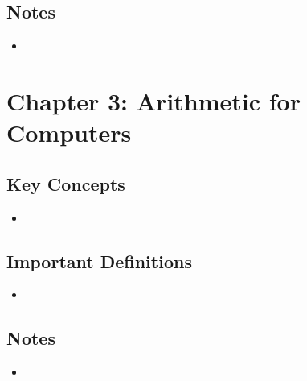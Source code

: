 \documentclass[12pt]{article}
\begin{document}
\subsection*{Notes}
\begin{itemize}
    \item 
\end{itemize}

\newpage

\section*{Chapter 3: Arithmetic for Computers}
\subsection*{Key Concepts}
\begin{itemize}
    \item 
\end{itemize}

\subsection*{Important Definitions}
\begin{itemize}
    \item 
\end{itemize}

\subsection*{Notes}
\begin{itemize}
    \item 
\end{itemize}

\newpage

%
%
%
\end{document}
